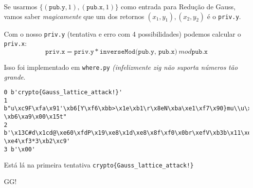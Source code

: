 \documentclass{article}
\begin{document}
Se usarmos \( \{ (\texttt{pub.y}, 1) , (\texttt{pub.x}, 1) \} \)
como entrada para Redução de Gauss,
vamos saber \emph{magicamente} que
um dos retornos \( (x_1, y_1), (x_2, y_2) \) é o \texttt{priv.y}.

Com o nosso \texttt{priv.y} (tentativa e erro com 4 possibilidades)
podemos calcular o \texttt{priv.x}:
\[
    \texttt{priv.x} =
    \texttt{priv.y} * \texttt{inverseMod(pub.y, pub.x)} \ mod \texttt{pub.x}
\]

Isso foi implementado em \texttt{where.py}
\textit{(infelizmente zig não suporta números tão grande}.

\begin{verbatim}
0 b'crypto{Gauss_lattice_attack!}'
1 b"u\xc9F\xfa\x91'\xb6[Y\xf6\xbb>\x1e\xb1\r\x8eN\xba\xe1\xf7\x90}mu\\u\xb3
\xb6\xa9\x00\x15t"
2 b'\x13C#d\x1cd@\xe60\xfdP\x19\xe8\x1d\xe8\x8f\xf0\x0br\xefV\xb3b\x11\xe6\x02
\xe4\xf3*3\xb2\xc9'
3 b'\x00'
\end{verbatim}

Está lá na primeira tentativa \verb.crypto{Gauss_lattice_attack!}.

GG!
\end{document}
